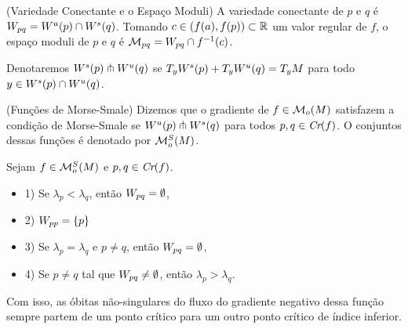 \documentclass{beamer}
\begin{document}
	\begin{frame}
		
		\begin{definicao}
			(Variedade Conectante e o Espaço Moduli) A variedade conectante de $p$ e $q$ é $W_{pq} = W^{u}(p)\cap W^{s}(q)$. Tomando $c \in (f(a), f(p)) \subset \mathbb{R}^{}$ um valor regular de $f$, o espaço moduli de $p$ e $q$ é $\mathcal{M}_{pq} = W_{pq}\cap f^{-1}(c)$.
		\end{definicao}
		
		Denotaremos $W^{s}(p)\pitchfork W^{u}(q)$ se $T_{y}W^{s}(p) + T_{y}W^{u}(q) = T_{y}M$ para todo $y \in W^{s}(p)\cap W^{u}(q)$.
		\begin{definicao}
			(Funções de Morse-Smale) Dizemos que o gradiente de $f \in \mathcal{M}_{o}(M)$ satisfazem a condição de Morse-Smale se $W^{u}(p)\pitchfork W^{s}(q)$ para todos $p,q \in \textit{Cr}(f)$. O conjuntos dessas funções é denotado por $\mathcal{M}^{S}_{o}(M)$.
		\end{definicao}
		
	\end{frame}
	
	\begin{frame}
		\begin{proposicao}
			Sejam $f \in \mathcal{M}^{S}_{o}(M)$ e $p,q \in \textit{Cr}(f)$.
			\begin{itemize}
				\item 1) Se $\lambda_{p}<\lambda_{q}$, então $W_{pq} = \emptyset$,
				
				\item 2) $W_{pp} = \{p\}$
				
				\item 3) Se $\lambda_{p} = \lambda_{q}$ e $p\neq q$, então $W_{pq} = \emptyset$,
				
				\item 4) Se $p \neq q$ tal que $W_{pq} \neq \emptyset$, então $\lambda_{p}>\lambda_{q}$.
			\end{itemize}
		\end{proposicao}
		
		Com isso, as óbitas não-singulares do fluxo do gradiente negativo dessa função sempre partem de um ponto crítico para um outro ponto crítico de índice inferior.
		
	\end{frame}
	
\end{document}
